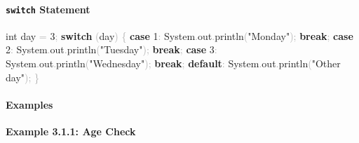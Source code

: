\documentclass[
  justified,
  openright,
]{tufte-book}
\let\subsection\paragraph
\let\paragraph\paragraph
\newcommand{\KeywordTok}[1]{\textcolor{CodeKeyword}{\textbf{#1}}}  %
\newcommand{\StringTok}[1]{\textcolor{CodeString}{#1}}              %
\newcommand{\CodeNumTok}[1]{\textcolor{CodeNumber}{#1}}             %
\newcommand{\CodeFuncTok}[1]{\textcolor{CodeKeyword}{#1}}           %
\newcommand{\CodeTypeTok}[1]{\textcolor{CodeType}{#1}}              %
\newcommand{\OperatorTok}[1]{\textcolor{DarkGray}{#1}}              %
\newenvironment{Shaded}{%
  \begin{mdframed}[style=TufteCode]%
}{%
  \end{mdframed}%
}
\let\subsection\paragraph
\let\paragraph\paragraph
\begin{document}
\subsection{\texorpdfstring{\texttt{switch}
Statement}{switch Statement}}\label{switch-statement-1}

\begin{Shaded}
\begin{Highlighting}[]
\CodeTypeTok{int} day \OperatorTok{=} \CodeNumTok{3}\OperatorTok{;}
\KeywordTok{switch} \OperatorTok{(}day\OperatorTok{)} \OperatorTok{\{}
    \KeywordTok{case} \CodeNumTok{1}\OperatorTok{:}
        System\OperatorTok{.}\CodeFuncTok{out}\OperatorTok{.}\CodeFuncTok{println}\OperatorTok{(}\StringTok{"Monday"}\OperatorTok{);}
        \KeywordTok{break}\OperatorTok{;}
    \KeywordTok{case} \CodeNumTok{2}\OperatorTok{:}
        System\OperatorTok{.}\CodeFuncTok{out}\OperatorTok{.}\CodeFuncTok{println}\OperatorTok{(}\StringTok{"Tuesday"}\OperatorTok{);}
        \KeywordTok{break}\OperatorTok{;}
    \KeywordTok{case} \CodeNumTok{3}\OperatorTok{:}
        System\OperatorTok{.}\CodeFuncTok{out}\OperatorTok{.}\CodeFuncTok{println}\OperatorTok{(}\StringTok{"Wednesday"}\OperatorTok{);}
        \KeywordTok{break}\OperatorTok{;}
    \KeywordTok{default}\OperatorTok{:}
        System\OperatorTok{.}\CodeFuncTok{out}\OperatorTok{.}\CodeFuncTok{println}\OperatorTok{(}\StringTok{"Other day"}\OperatorTok{);}
\OperatorTok{\}}
\end{Highlighting}
\end{Shaded}

\subsection{Examples}\label{examples-23}

\textbf{Example 3.1.1: Age Check}
\end{document}
